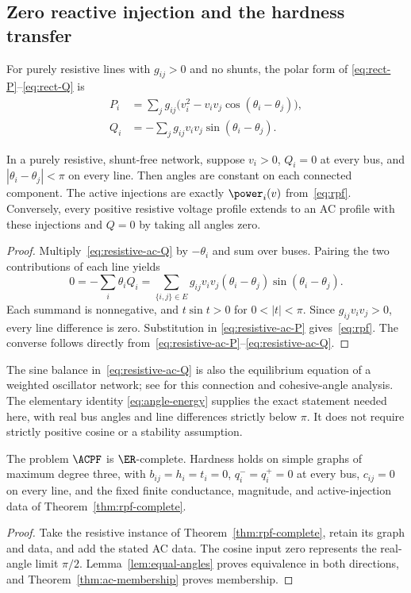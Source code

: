\subsection{Zero reactive injection and the hardness transfer}

For purely resistive lines with $g_{ij}>0$ and no shunts, the polar form of
\eqref{eq:rect-P}--\eqref{eq:rect-Q} is
\begin{align}
 P_i&=\sum_j g_{ij}\bigl(v_i^2-v_iv_j\cos(\theta_i-\theta_j)\bigr),
 \label{eq:resistive-ac-P}\\
 Q_i&=-\sum_j g_{ij}v_iv_j\sin(\theta_i-\theta_j).
 \label{eq:resistive-ac-Q}
\end{align}

\begin{lemma}
\label{lem:equal-angles}
In a purely resistive, shunt-free network, suppose $v_i>0$, $Q_i=0$ at
every bus, and $|\theta_i-\theta_j|<\pi$ on every line. Then angles are
constant on each connected component. The active injections are exactly
$\power_i(v)$ from~\eqref{eq:rpf}. Conversely, every positive resistive
voltage profile extends to an AC profile with these injections and $Q=0$
by taking all angles zero.
\end{lemma}
\begin{proof}
Multiply~\eqref{eq:resistive-ac-Q} by $-\theta_i$ and sum over buses.
Pairing the two contributions of each line yields
\begin{equation}
 0=-\sum_i\theta_i Q_i
 =\sum_{\{i,j\}\in E}g_{ij}v_iv_j
 (\theta_i-\theta_j)\sin(\theta_i-\theta_j).
 \label{eq:angle-energy}
\end{equation}
Each summand is nonnegative, and $t\sin t>0$ for $0<|t|<\pi$.
Since $g_{ij}v_iv_j>0$, every line difference is zero. Substitution in
\eqref{eq:resistive-ac-P} gives~\eqref{eq:rpf}. The converse follows directly
from~\eqref{eq:resistive-ac-P}--\eqref{eq:resistive-ac-Q}.
\end{proof}

The sine balance in~\eqref{eq:resistive-ac-Q} is also the equilibrium equation
of a weighted oscillator network; see \citet{DorflerEtAl2013} for this
connection and cohesive-angle analysis. The elementary identity
\eqref{eq:angle-energy} supplies the exact statement needed here, with real
bus angles and line differences strictly below $\pi$. It does not require
strictly positive cosine or a stability assumption.

\begin{theorem}
\label{thm:ac-complete}
The problem $\ACPF$ is $\ER$-complete. Hardness holds on simple graphs of
maximum degree three, with $b_{ij}=h_i=t_i=0$, $q_i^-=q_i^+=0$ at every bus,
$c_{ij}=0$ on every line, and the fixed finite conductance, magnitude, and
active-injection data of Theorem~\ref{thm:rpf-complete}.
\end{theorem}
\begin{proof}
Take the resistive instance of Theorem~\ref{thm:rpf-complete}, retain its
graph and data, and add the stated AC data. The cosine input zero represents
the real-angle limit $\pi/2$. Lemma~\ref{lem:equal-angles} proves equivalence
in both directions, and Theorem~\ref{thm:ac-membership} proves membership.
\end{proof}


